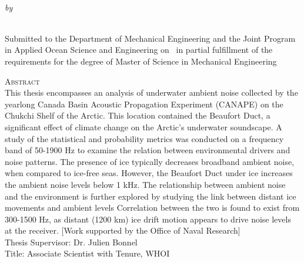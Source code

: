 \begin{center}
{\large \@title} \\
\emph{\footnotesize by} \\
\@author \\
\end{center}

\vspace{-1em}

\begin{center}
\begin{singlespace}
{\parindent0pt
\small
Submitted to the Department of Mechanical Engineering and the Joint Program in Applied Ocean Science and Engineering on \@date ~in partial fulfillment of the requirements for the degree of Master of Science in Mechanical Engineering}
\end{singlespace}
\end{center}

\begin{singlespace}
{\parindent0pt 
	{\large \textsc{Abstract}} \\ %
This thesis encompasses an analysis of underwater ambient noise collected by the yearlong Canada Basin Acoustic Propagation Experiment (CANAPE) on the Chukchi Shelf of the Arctic. This location contained the Beaufort Duct, a significant effect of climate change on the Arctic's underwater soundscape. A study of the statistical and probability metrics was conducted on a frequency band of 50-1900 Hz to examine the relation between environmental drivers and noise patterns. The presence of ice typically decreases broadband ambient noise, when compared to ice-free seas. However, the Beaufort Duct under ice increases the ambient noise levels below 1 kHz. The relationship between ambient noise and the environment is further explored by studying the link between distant ice movements and ambient levels Correlation between the two is found to exist from 300-1500 Hz, as distant (1200 km) ice drift motion appears to drive noise levels at the receiver. [Work supported by the Office of Naval Research] \\


	\noindent Thesis Supervisor: Dr. Julien Bonnel \\
	\noindent Title: Associate Scientist with Tenure, WHOI \\
}
\end{singlespace}

\newpage
\null
\newpage